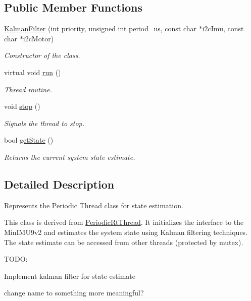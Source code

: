\subsection*{\-Public \-Member \-Functions}
\begin{DoxyCompactItemize}
\item 
\hyperlink{class_u_s_u_1_1_kalman_filter_a65e87c695dac9877015a2ace1471fdc2}{\-Kalman\-Filter} (int priority, unsigned int period\-\_\-us, const char $\ast$i2c\-Imu, const char $\ast$i2c\-Motor)
\begin{DoxyCompactList}\small\item\em \-Constructor of the class. \end{DoxyCompactList}\item 
virtual void \hyperlink{class_u_s_u_1_1_kalman_filter_a47cc7f620b57b25133289e61dbf2a7be}{run} ()
\begin{DoxyCompactList}\small\item\em \-Thread routine. \end{DoxyCompactList}\item 
void \hyperlink{class_u_s_u_1_1_kalman_filter_a3f8b3ce719dcb24745150f8c4ef361b8}{stop} ()
\begin{DoxyCompactList}\small\item\em \-Signals the thread to stop. \end{DoxyCompactList}\item 
bool \hyperlink{class_u_s_u_1_1_kalman_filter_a3ed1c15b5301f0840f6a7a3d7696fb0a}{get\-State} ()
\begin{DoxyCompactList}\small\item\em \-Returns the current system state estimate. \end{DoxyCompactList}\end{DoxyCompactItemize}


\subsection{\-Detailed \-Description}
\-Represents the \-Periodic \-Thread class for state estimation. 

\-This class is derived from \hyperlink{class_u_s_u_1_1_periodic_rt_thread}{\-Periodic\-Rt\-Thread}. \-It initializes the interface to the \-Min\-I\-M\-U9v2 and estimates the system state using \-Kalman filtering techniques. \-The state estimate can be accessed from other threads (protected by mutex).

\-T\-O\-D\-O\-:
\begin{DoxyItemize}
\item \-Implement kalman filter for state estimate
\item change name to something more meaningful? 
\end{DoxyItemize}

